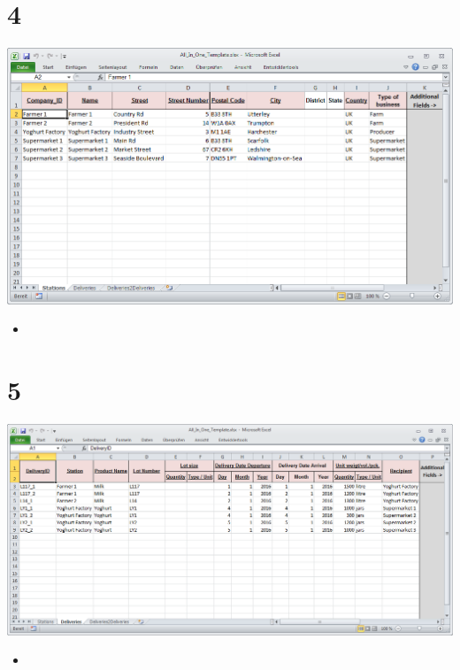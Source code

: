 \documentclass{beamer}
\begin{document}
\section{4}
\begin{frame}
	\begin{center}
  		\includegraphics[height=0.6\textheight]{4.png}
	\end{center}
	\begin{itemize}
		\item
	\end{itemize}
\end{frame}

\section{5}
\begin{frame}
	\begin{center}
  		\includegraphics[height=0.6\textheight]{5.png}
	\end{center}
	\begin{itemize}
		\item
	\end{itemize}
\end{frame}
\end{document}
